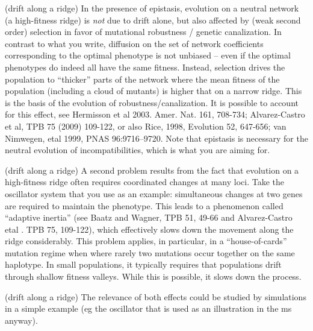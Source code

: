 \begin{point}{(drift along a ridge)}
    In the presence of epistasis, evolution on a neutral network (a high-fitness
    ridge) is \emph{not} due to drift alone, but also affected by (weak second order)
    selection in favor of mutational robustness / genetic canalization. In contrast
    to what you write, diffusion on the set of network coefficients corresponding
    to the optimal phenotype is not unbiased -- even if the optimal phenotypes do
    indeed all have the same fitness. Instead, selection drives the population to
    ``thicker'' parts of the network where the mean fitness of the population
    (including a cloud of mutants) is higher that on a narrow ridge. This is the
    basis of the evolution of robustness/canalization. It is possible to account
    for this effect, see Hermisson et al 2003. Amer. Nat. 161, 708-734;
    Alvarez-Castro et al, TPB 75 (2009) 109-122, or also Rice, 1998, Evolution 52,
    647-656; van Nimwegen, etal 1999, PNAS 96:9716–9720. Note that epistasis is
    necessary for the neutral evolution of incompatibilities, which is what you are
    aiming for.
\end{point}

\reply{
}

\begin{point}{(drift along a ridge)}
    A second problem results from the fact that evolution on a high-fitness ridge
    often requires coordinated changes at many loci. Take the oscillator system
    that you use as an example: simultaneous changes at two genes are required to
    maintain the phenotype. This leads to a phenomenon called ``adaptive inertia''
    (see Baatz and Wagner, TPB 51, 49-66 and Alvarez-Castro etal . TPB 75, 109-122),
    which effectively slows down the movement along the ridge considerably. This
    problem applies, in particular, in a ``house-of-cards'' mutation regime when
    where rarely two mutations occur together on the same haplotype. In small
    populations, it typically requires that populations drift through shallow
    fitness valleys. While this is possible, it slows down the process.  
\end{point}

\reply{
}

\begin{point}{(drift along a ridge)}
    The relevance of both effects could be studied by simulations in a simple
example (eg the oscillator that is used as an illustration in the ms anyway).
\end{point}

